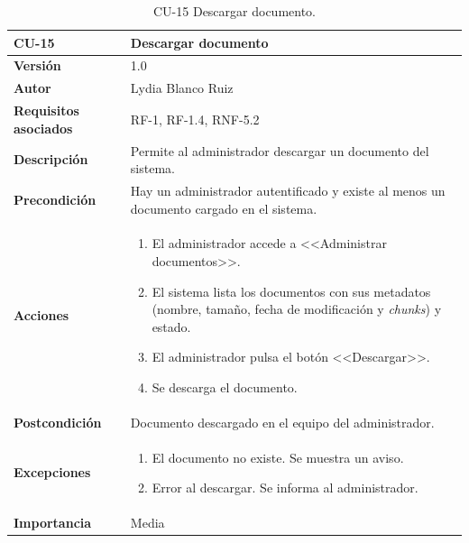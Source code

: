 \begin{table}[p]
	\centering
	\begin{tabularx}{\linewidth}{ p{} p{} }
		\toprule
		\textbf{CU-15}    & \textbf{Descargar documento}\\
		\toprule
		\textbf{Versión}              & 1.0    \\
		\textbf{Autor}                & Lydia Blanco Ruiz \\
		\textbf{Requisitos asociados} & RF-1, RF-1.4, RNF-5.2 \\
		\textbf{Descripción}          & Permite al administrador descargar un documento del sistema. \\
		\textbf{Precondición}         & Hay un administrador autentificado y existe al menos un documento cargado en el sistema. \\
		\textbf{Acciones}             &
		\begin{enumerate}
			\def\labelenumi{\arabic{enumi}.}
			\tightlist
			\item El administrador accede a <<Administrar documentos>>.
			\item El sistema lista los documentos con sus metadatos (nombre, tamaño, fecha de modificación y \textit{chunks}) y estado.
			\item El administrador pulsa el botón <<Descargar>>.
			\item Se descarga el documento.
		\end{enumerate}\\
		\textbf{Postcondición}        & Documento descargado en el equipo del administrador. \\
		\textbf{Excepciones}          & 
		\begin{enumerate}
			\def\labelenumi{\arabic{enumi}.}
			\tightlist
			\item El documento no existe. Se muestra un aviso. 
			\item Error al descargar. Se informa al administrador.
		\end{enumerate}\\
		\textbf{Importancia}          & Media  \\
		\bottomrule
	\end{tabularx}
	\caption{CU-15 Descargar documento.}
\end{table}

